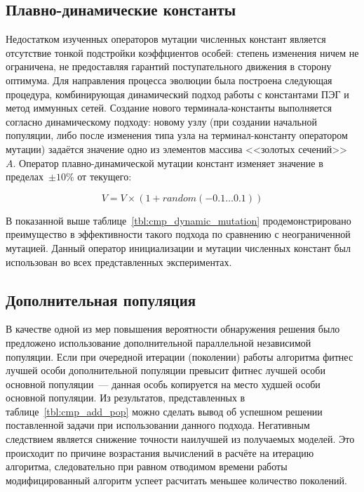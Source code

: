 
\subsection{Плавно-динамические константы}

Недостатком изученных операторов мутации численных констант является отсутствие тонкой подстройки коэффциентов особей: степень изменения ничем не ограничена, не предоставляя гарантий поступательного движения в сторону оптимума. Для направления процесса эволюции была построена следующая процедура, комбинирующая динамический подход работы с константами ПЭГ и метод иммунных сетей. Создание нового терминала-константы выполняется согласно динамическому подходу: новому узлу (при создании начальной популяции, либо после изменения типа узла на терминал-константу оператором мутации) задаётся значение одно из элементов массива <<золотых сечений>>~$A$. Оператор плавно-динамической мутации констант изменяет значение в пределах~$\pm10\%$ от текущего:

\begin{equation}
\label{eq:zerg_const_mutation}
V = V \times (1 + random(-0.1\ldots0.1))
\end{equation}

В показанной выше таблице~\ref{tbl:cmp_dynamic_mutation} продемонстрировано преимущество в эффективности такого подхода по сравнению с неограниченной мутацией. Данный оператор инициализации и мутации численных констант был использован во всех представленных экспериментах.


\subsection{Дополнительная популяция}

В качестве одной из мер повышения вероятности обнаружения решения было предложено использование дополнительной параллельной независимой популяции. Если при очередной итерации (поколении) работы алгоритма фитнес лучшей особи дополнительной популяции превысит фитнес лучшей особи основной популяции~--- данная особь копируется на место худшей особи основной популяции. Из результатов, представленных в таблице~\ref{tbl:cmp_add_pop} можно сделать вывод об успешном решении поставленной задачи при использовании данного подхода. Негативным следствием является снижение точности наилучшей из получаемых моделей. Это происходит по причине возрастания вычислений в расчёте на итерацию алгоритма, следовательно при равном отводимом времени работы модифицированный алгоритм успеет расчитать меньшее количество поколений.

